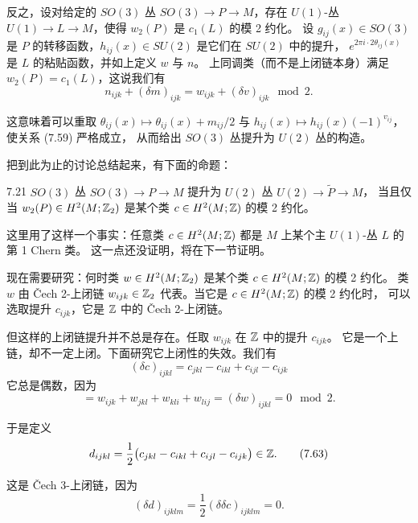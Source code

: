 反之，设对给定的 $SO(3)$ 丛 $SO(3)\to P\to M$，存在 $U(1)$-丛
$U(1)\to L\to M$，使得 $w_2(P)$ 是 $c_1(L)$ 的模 2 约化。
设 $g_{ij}(x)\in SO(3)$ 是 $P$ 的转移函数，$h_{ij}(x)\in SU(2)$ 是它们在 $SU(2)$ 中的提升，
$e^{2\pi i\cdot2\theta_{ij}(x)}$ 是 $L$ 的粘贴函数，并如上定义 $w$ 与 $n$。
上同调类（而不是上闭链本身）满足 $w_2(P)=c_1(L)$，这说我们有
\begin{equation}
n_{ijk}+(\delta m)_{ijk}=w_{ijk}+(\delta v)_{ijk}\mod 2.
\tag{7.60}
\end{equation}

这意味着可以重取 $\theta_{ij}(x)\mapsto\theta_{ij}(x)+m_{ij}/2$ 与
$h_{ij}(x)\mapsto h_{ij}(x)(-1)^{v_{ij}}$，使关系 (7.59) 严格成立，
从而给出 $SO(3)$ 丛提升为 $U(2)$ 丛的构造。

把到此为止的讨论总结起来，有下面的命题：

\begin{proposition}{7.21}
$SO(3)$ 丛 $SO(3)\to P\to M$ 提升为 $U(2)$ 丛 $U(2)\to\tilde P\to M$，
当且仅当 $w_2(P)\in H^2(M;\mathbb{Z}_2)$ 是某个类 $c\in H^2(M;\mathbb{Z})$ 的模 2 约化。
\end{proposition}

这里用了这样一个事实：任意类 $c\in H^2(M;\mathbb{Z})$ 都是 $M$ 上某个主 $U(1)$-丛 $L$ 的第 1 Chern 类。
这一点还没证明，将在下一节证明。

现在需要研究：何时类 $w\in H^2(M;\mathbb{Z}_2)$ 是某个类 $c\in H^2(M;\mathbb{Z})$ 的模 2 约化。
类 $w$ 由 Čech 2-上闭链 $w_{ijk}\in\mathbb{Z}_2$ 代表。当它是 $c\in H^2(M;\mathbb{Z})$ 的模 2 约化时，
可以选取提升 $c_{ijk}$，它是 $\mathbb{Z}$ 中的 Čech 2-上闭链。

但这样的上闭链提升并不总是存在。任取 $w_{ijk}$ 在 $\mathbb{Z}$ 中的提升 $c_{ijk}$。
它是一个上链，却不一定上闭。下面研究它上闭性的失效。我们有
\begin{equation}
(\delta c)_{ijkl}=c_{jkl}-c_{ikl}+c_{ijl}-c_{ijk}
\tag{7.61}
\end{equation}
它总是偶数，因为
\begin{equation}
=w_{ijk}+w_{jkl}+w_{kli}+w_{lij}=(\delta w)_{ijkl}=0\mod 2.
\tag{7.62}
\end{equation}

于是定义
\begin{equation}
d_{ijkl}=\frac12\bigl(c_{jkl}-c_{ikl}+c_{ijl}-c_{ijk}\bigr)\in\mathbb{Z}.
\tag{7.63}
\end{equation}

这是 Čech 3-上闭链，因为
\begin{equation}
(\delta d)_{ijklm}=\frac12(\delta\delta c)_{ijklm}=0.
\tag{7.64}
\end{equation}

